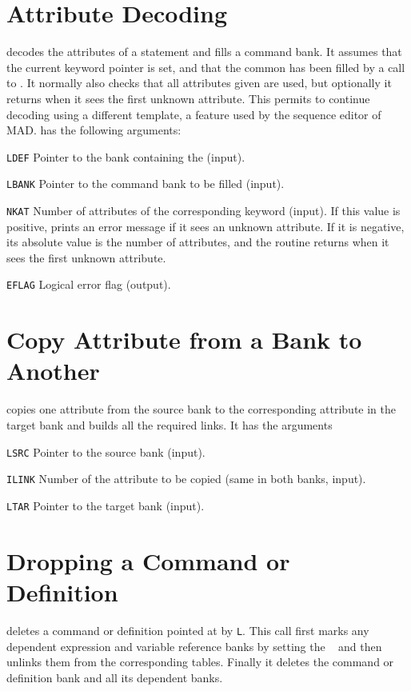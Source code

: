 \section{Attribute Decoding}
\label{AAATTR}
decodes the attributes of a statement and fills a command bank.
It assumes that the current keyword pointer  is set,
and that the  common has been filled by a call to
.
It normally also checks that all attributes given are used,
but optionally it returns when it sees the first unknown attribute.
This permits to continue decoding using a different template,
a feature used by the sequence editor of MAD.
 has the following arguments:
\begin{mylist}
\item[\tt LDEF]
Pointer to the bank containing the 
 (input).
\item[\tt LBANK]
Pointer to the command bank to be filled (input).
\item[\tt NKAT]
Number of attributes of the corresponding keyword (input).
If this value is positive,
 prints an error message if it sees an unknown
attribute.
If it is negative,
its absolute value is the number of attributes,
and the routine returns when it sees the first unknown attribute.
\item[\tt EFLAG]
Logical error flag (output).
\end{mylist}

\section{Copy Attribute from a Bank to Another}
\label{AACOPY}
copies one attribute from the source bank to the corresponding attribute
in the target bank and builds all the required links.
It has the arguments
\begin{mylist}
\item[\tt LSRC]
Pointer to the source bank (input).
\item[\tt ILINK]
Number of the attribute to be copied (same in both banks, input).
\item[\tt LTAR]
Pointer to the target bank (input).
\end{mylist}

\section{Dropping a Command or Definition}
\label{AADROP}
deletes a command or definition pointed at by {\tt L}.
This call first marks any dependent expression and variable reference
banks by setting the ~ 
and then unlinks them from the corresponding tables.
Finally it deletes the command or definition bank and all its
dependent banks.

